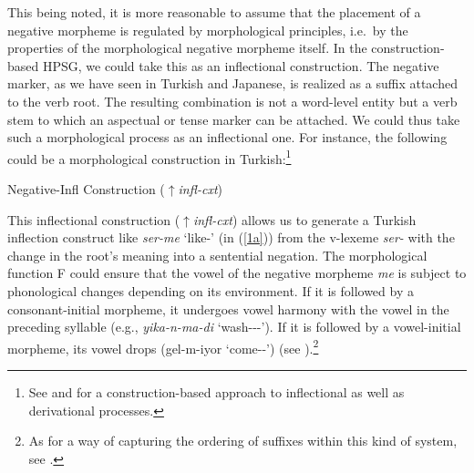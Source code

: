 \documentclass[output=paper]{langsci/langscibook}
\begin{document}
This being noted, it is more reasonable to assume that the placement of a
negative morpheme is regulated by morphological principles, i.e.\ by
the properties of the morphological negative morpheme itself. In the
construction-based HPSG, we could take this as an inflectional
construction.  The negative marker, as we have seen in Turkish and Japanese, is realized as a suffix
attached to the verb root. The resulting combination is not
a word-level entity but a verb stem to which an aspectual or tense marker can be attached. We could thus take such a morphological process as an inflectional
one. For instance, the following could be a morphological
construction in Turkish:\footnote{See
\citet{Sag:12} and \citet{Hilpert:16} for a construction-based approach to
inflectional as well as derivational processes.}



\begin{exe}
\ex Negative-Infl Construction ($\uparrow${\it infl-cxt}) \\
\end{exe}

%
This inflectional construction ($\uparrow${\it infl-cxt}) allows us to generate a Turkish inflection construct like {\it ser-me} `like-\NEG' (in
(\ref{1a})) from the v-lexeme {\it ser-} with the change in the root's meaning into a sentential negation. The morphological function F could ensure that the vowel of the negative morpheme {\it me} is subject to phonological changes depending on its environment. If it is followed by a consonant-initial morpheme, it undergoes vowel harmony with the vowel in the preceding syllable (e.g., {\it yika-n-ma-di} `wash-\REFL-\NEG-\PST'). If it is followed by a vowel-initial morpheme, its vowel drops (gel-m-iyor `come-\NEG-\PROG') (see \citet{kelepir}).\footnote{As
 for a way of capturing the ordering of suffixes within this kind of system,
 see \citet{Kim:16}.}
\end{document}
